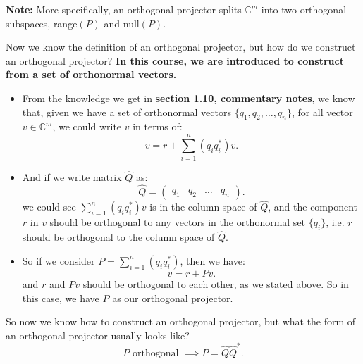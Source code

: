 \noindent \textbf{Note:} More specifically, an orthogonal projector splits $\mathbb{C}^{m}$ into two orthogonal subspaces, range$(P)$ and null$(P)$.

\bigskip
\noindent Now we know the definition of an orthogonal projector, but how do we construct an orthogonal projector? \textbf{In this course, we are introduced to construct from a set of orthonormal vectors.} 
\begin{itemize}
\item From the knowledge we get in \textbf{section 1.10, commentary notes}, we know that, given we have a set of orthonormal vectors $\{q_1, q_2, \ldots, q_n\}$, for all vector $v \in \mathbb{C}^{m}$, we could write $v$ in terms of:
  \[
    v = r + \sum_{i = 1}^{n} (q_iq_i^{*})v
  .\] 
\item And if we write matrix $\hat{Q}$ as:
  \[
    \hat{Q} = \begin{pmatrix} q_1 & q_2 & \ldots & q_n \end{pmatrix} 
  .\]
  we could see $\sum_{i=1}^{n} (q_iq_i^{*})v$ is in the column space of $\hat{Q}$, and the component $r$ in $v$ should be orthogonal to any vectors in the orthonormal set $ \{q_i\} $, i.e. $r$ should be orthogonal to the column space of $\hat{Q}$.
  \item So if we consider $P = \sum_{i=1}^{n} (q_iq_i^{*})$, then we have:
    \[
    v = r + Pv
    .\] 
    and $r$ and $Pv$ should be orthogonal to each other, as we stated above. So in this case, we have $P$ as our orthogonal projector.
\end{itemize}
So now we know how to construct an orthogonal projector, but what the form of an orthogonal projector usually looks like?
\[
P \text{ orthogonal } \implies P = \hat{Q}\hat{Q}^{*}
.\] 
